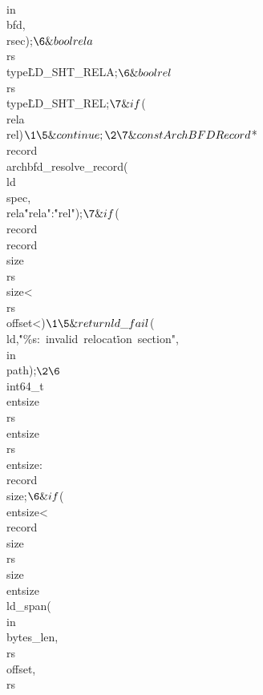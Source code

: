 \\{in}\MG\\{bfd},\\{rsec});{}$\6
\&{bool} \\{rela}${}\K\\{rs}\MG\\{type}\E\.{LD\_SHT\_RELA};{}$\6
\&{bool} \\{rel}${}\K\\{rs}\MG\\{type}\E\.{LD\_SHT\_REL};{}$\7
\&{if} ${}(\R\\{rela}\W\R\\{rel}){}$\1\5
\&{continue};\2\7
\&{const} \\{ArchBFDRecord}${}{*}\\{record}\K\\{archbfd\_resolve\_record}(%
\\{ld}\MG\\{spec},\\{rela}\?\.{"rela"}:\.{"rel"});{}$\7
\&{if} ${}(\R\\{record}\V\\{record}\MG\\{size}\Z{}\V\\{rs}\MG\\{size}<%
\V\\{rs}\MG\\{offset}<){}$\1\5
\&{return} \\{ld\_fail}${}(\\{ld},\.{"\%s:\ invalid\ relocat}\)\.{ion\
section"},\\{in}\MG\\{path});{}$\2\6
${}\\{int64\_t}\\{entsize}\K\\{rs}\MG\\{entsize}\?\\{rs}\MG\\{entsize}:%
\\{record}\MG\\{size};{}$\6
\&{if} ${}(\\{entsize}<\\{record}\MG\\{size}\V\\{rs}\MG\\{size}\MOD\\{entsize}%
\V\R\\{ld\_span}(\\{in}\MG\\{bytes\_len},\\{rs}\MG\\{offset},\39\\{rs}\MG%
